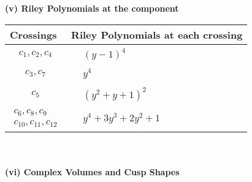\documentclass[1p]{elsarticle_modified}
\theoremstyle{definition}
\begin{document}
\newpage\renewcommand{\arraystretch}{1}
\flushleft \textbf{(v) Riley Polynomials at the component}\newline \\
\begin{tabular}{m{50pt}|m{274pt}}
Crossings & \hspace{64pt}Riley Polynomials at each crossing \\
\hline $$\begin{aligned}c_{1},c_{2},c_{4}\end{aligned}$$&$\begin{aligned}
&(y-1)^4
\end{aligned}$\\
\hline $$\begin{aligned}c_{3},c_{7}\end{aligned}$$&$\begin{aligned}
&y^4
\end{aligned}$\\
\hline $$\begin{aligned}c_{5}\end{aligned}$$&$\begin{aligned}
&(y^2+y+1)^2
\end{aligned}$\\
\hline $$\begin{aligned}c_{6},c_{8},c_{9}\\c_{10},c_{11},c_{12}\end{aligned}$$&$\begin{aligned}
&y^4+3 y^3+2 y^2+1
\end{aligned}$\\
\hline
\end{tabular}\\~\\
\newpage\flushleft \textbf{(vi) Complex Volumes and Cusp Shapes}
\end{document}
